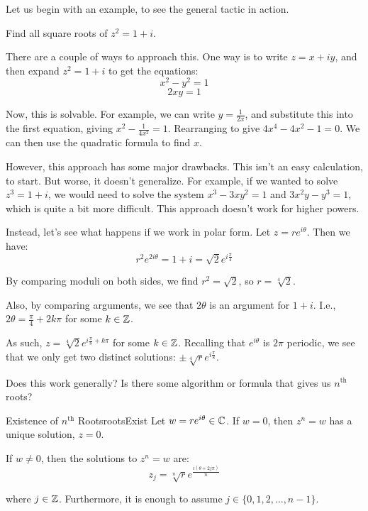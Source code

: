 Let us begin with an example, to see the general tactic in action.

\begin{ex}{}{} Find all square roots of $z^2 = 1 + i$.

There are a couple of ways to approach this. One way is to write $z = x + iy$, and then expand $z^2 = 1+i$ to get the equations:
$$x^2 - y^2 = 1$$
$$2xy = 1$$

Now, this is solvable. For example, we can write $y = \frac{1}{2x}$, and substitute this into the first equation, giving $x^2 - \frac{1}{4x^2} = 1$. Rearranging to give $4x^4 - 4x^2 - 1 = 0$. We can then use the quadratic formula to find $x$.

However, this approach has some major drawbacks. This isn't an easy calculation, to start. But worse, it doesn't generalize. For example, if we wanted to solve $z^3 = 1+i$, we would need to solve the system $x^3 - 3xy^2 = 1$ and $3x^2y - y^3 = 1$, which is quite a bit more difficult. This approach doesn't work for higher powers.

Instead, let's see what happens if we work in polar form. Let $z = re^{i\theta}$. Then we have:
$$r^2e^{2i\theta} = 1 + i = \sqrt{2}e^{i\frac{\pi}{4}}$$

By comparing moduli on both sides, we find $r^2 = \sqrt{2}$, so $r = \sqrt[4]{2}$.

Also, by comparing arguments, we see that $2\theta$ is an argument for $1 + i$. I.e., $2\theta = \frac{\pi}{4} + 2k\pi$ for some $k\in \mathbb{Z}$.

As such, $z = \sqrt[4]{2}e^{i\frac{\pi}{8} + k\pi}$ for some $k\in \mathbb{Z}$. Recalling that $e^{i\theta}$ is $2\pi$ periodic, we see that we only get two distinct solutions: $\pm\sqrt[4]{r}e^{i\frac{\pi}{8}}$. 
\end{ex}

Does this work generally? Is there some algorithm or formula that gives us $n^\text{th}$ roots?

\begin{thmbo}{Existence of $n^{\text{th}}$ Roots}{rootsExist} 
Let $w = re^{i\theta} \in \mathbb{C}$. If $w = 0$, then $z^n = w$ has a unique solution, $z = 0$.

If $w\ne 0$, then the solutions to $z^n = w$ are:
$$z_j = \sqrt[n]{r}e^{\frac{i(\theta + 2j\pi)}{n}}$$

\noin where $j \in \mathbb{Z}$. Furthermore, it is enough to assume $j\in \{0,1,2,\dots,n-1\}$.
\end{thmbo}

